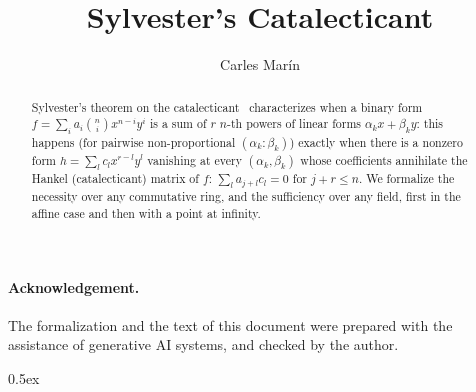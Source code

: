 \documentclass[10pt,a4paper]{article}
\begin{document}
\title{Sylvester's Catalecticant}
\author{Carles Mar\'in}
\maketitle

\begin{abstract}
Sylvester's theorem on the catalecticant~\cite{Sylvester1851} characterizes when a binary form
$f=\sum_i a_i\binom{n}{i}x^{n-i}y^i$ is a sum of $r$ $n$-th powers of linear forms $\alpha_k x+\beta_k y$: this happens
(for pairwise non-proportional $(\alpha_k:\beta_k)$) exactly when there is a nonzero form
$h=\sum_l c_l x^{r-l}y^l$ vanishing at every $(\alpha_k,\beta_k)$ whose coefficients annihilate the Hankel
(catalecticant) matrix of $f$: $\sum_l a_{j+l}c_l=0$ for $j+r\le n$. We formalize the necessity over any commutative
ring, and the sufficiency over any field, first in the affine case and then with a point at infinity.
\end{abstract}

\paragraph{Acknowledgement.} The formalization and the text of this document were prepared with the
assistance of generative AI systems, and checked by the author.

\tableofcontents

\parindent 0pt\parskip 0.5ex





\end{document}
